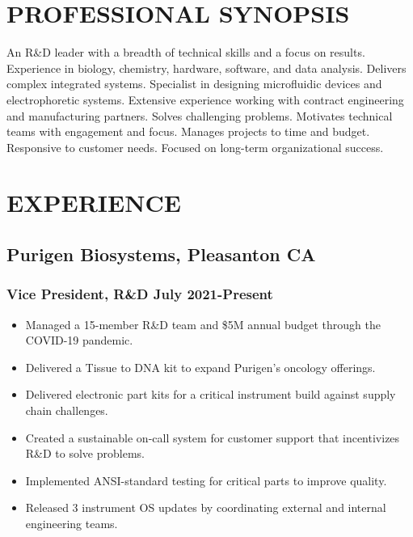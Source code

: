 \documentclass{res}
\begin{document}

\address{1125 Court Street \\ Alameda, CA 94538 \\ (650) 391-8463}

\address{Citizenship: United States \\ \\ lewis.a.marshall@gmail.com}

\begin{resume}

\section{PROFESSIONAL SYNOPSIS}
    An R\&D leader with a breadth of technical skills and a focus on results.\\[4pt]
    Experience in biology, chemistry, hardware, software, and data analysis.
    Delivers complex integrated systems.
    Specialist in designing microfluidic devices and electrophoretic systems.
    Extensive experience working with contract engineering and manufacturing partners.
    Solves challenging problems.
    Motivates technical teams with engagement and focus.
    Manages projects to time and budget.
    Responsive to customer needs.
    Focused on long-term organizational success.



\section{EXPERIENCE}
\vspace{-0.1in}

   \subsection{Purigen Biosystems, Pleasanton CA}
    \vspace{-0.1in}

    \subsubsection{Vice President, R\&D \> July 2021-Present}
       \begin{itemize}
        \item Managed a 15-member R\&D team and \$5M annual budget through the COVID-19 pandemic.
        \item Delivered a Tissue to DNA kit to expand Purigen's oncology offerings.
        \item Delivered electronic part kits for a critical instrument build against supply chain challenges.
        \item Created a sustainable on-call system for customer support that incentivizes R\&D to solve problems.
        \item Implemented ANSI-standard testing for critical parts to improve quality.
        \item Released 3 instrument OS updates by coordinating external and internal engineering teams.
       \end{itemize}


\end{resume}
\end{document}
